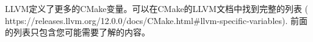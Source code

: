 LLVM定义了更多的CMake变量。可以在CMake的LLVM文档中找到完整的列表 (\\https://releases.llvm.org/12.0.0/docs/CMake.html\#llvm-specific-variables). 前面的列表只包含您可能需要了解的内容。\par













































